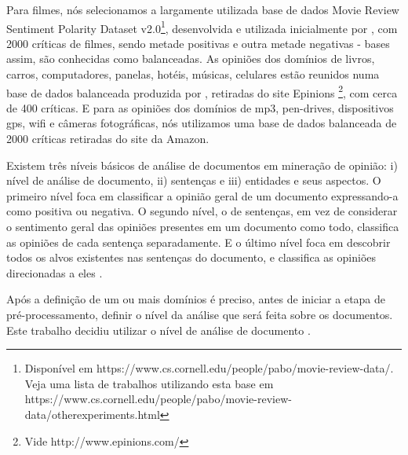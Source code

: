Para filmes, nós selecionamos a largamente utilizada base de dados Movie Review Sentiment Polarity Dataset v2.0\footnote{Disponível em https://www.cs.cornell.edu/people/pabo/movie-review-data/. Veja uma lista de trabalhos utilizando esta base em https://www.cs.cornell.edu/people/pabo/movie-review-data/otherexperiments.html}, desenvolvida e utilizada inicialmente por \cite{pang2004sentimental}, com 2000 críticas de filmes, sendo metade positivas e outra metade negativas - bases assim, são conhecidas como balanceadas. As opiniões dos domínios de livros, carros, computadores, panelas, hotéis, músicas, celulares estão reunidos numa base de dados   balanceada produzida por \cite{taboada2011lexicon}, retiradas do site Epinions \footnote{Vide http://www.epinions.com/}, com cerca de 400 críticas. E para as opiniões dos domínios de mp3, pen-drives, dispositivos gps, wifi e câmeras fotográficas, nós utilizamos uma base de dados  balanceada de 2000 críticas retiradas do site da Amazon. 


Existem três níveis básicos de análise de documentos em mineração de opinião: i) nível de análise de documento, ii) sentenças e iii) entidades e seus aspectos. O primeiro nível foca em classificar a opinião geral de um documento expressando-a como positiva ou negativa. O segundo nível, o de sentenças, em vez de considerar o sentimento geral das opiniões presentes em um documento como todo, classifica as opiniões de cada sentença separadamente. E o último nível foca em descobrir todos os alvos existentes nas sentenças do documento, e classifica as opiniões direcionadas a eles \cite{bing:2012}. 

Após a definição de um ou mais domínios é preciso, antes de iniciar a etapa de pré-processamento, definir o nível da análise que será feita sobre os documentos. Este trabalho decidiu utilizar o nível de análise de documento  \cite{joachims1998text, pang2002thumbs, gamon2004sentiment, mullen2004sentiment, pang2004sentimental, cui2006comparative}. 

